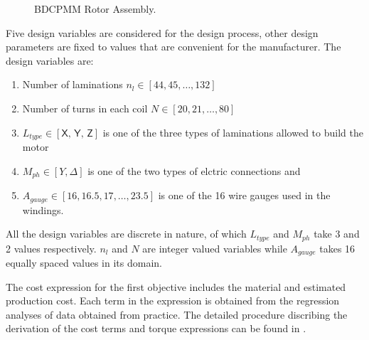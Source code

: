 \begin{figure}[ht]\begin{center}
 \caption{BDCPMM Rotor Assembly.}
 \label{bdcpmRotor}
\end{center}\end{figure}

Five design variables are considered for the design process, other design
parameters are fixed to values that are convenient for the
manufacturer. The design variables are:

\begin{enumerate}
\item Number of laminations $n_l \in [44, 45,\dots ,132]$
  
\item Number of turns in each coil  $N \in [20, 21, \dots, 80]$

\item $L_{type} \in [\textsf{X, Y, Z}]$ is one of the three types of 
laminations allowed to build the motor

\item $M_{ph} \in [Y, \Delta ]$ is one of the two types of elctric 
connections and

\item $A_{gauge} \in [16, 16.5, 17, \dots , 23.5]$ is one of the 16 
wire gauges used in the windings.
\end{enumerate}

All the design variables are discrete in nature, of which $L_{type}$ 
and $M_{ph}$ take 3 and 2 values respectively. $n_l$ and $N$ are 
integer valued variables while $A_{gauge}$ takes 16 equally spaced 
values in its domain.

The cost expression for the first objective includes the material and
estimated production cost. Each term in the expression is obtained from the
regression analyses of data obtained from practice. The detailed procedure
discribing the derivation of the cost terms and torque expressions can be
found in \citep{chidam99}.

